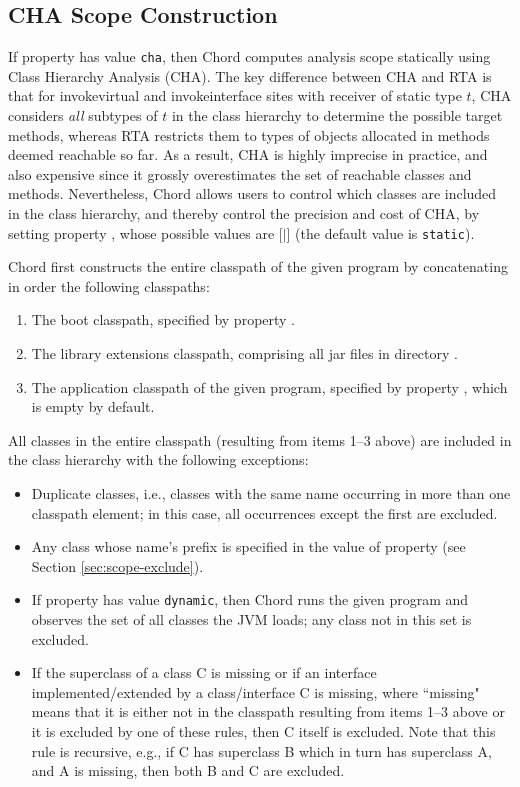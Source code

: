 \subsection{CHA Scope Construction}

If property  has value {\tt cha}, then Chord
computes analysis scope statically using Class Hierarchy Analysis (CHA).
The key difference between CHA and RTA is that for invokevirtual and
invokeinterface sites with receiver of static type $t$, CHA considers
{\it all} subtypes of $t$ in the class hierarchy to determine the
possible target methods, whereas RTA restricts them to types of
objects allocated in methods deemed reachable so far.  As a result,
CHA is highly imprecise in practice, and also expensive since it
grossly overestimates the set of reachable classes and methods.
Nevertheless, Chord allows users to control which classes are
included in the class hierarchy, and thereby control the
precision and cost of CHA, by setting property ,
whose possible values are [$|$] (the default
value is {\tt static}).

Chord first constructs the entire classpath of the given program by
concatenating in order the following classpaths:

\begin{enumerate}
\item
The boot classpath, specified by property .
\item
The library extensions classpath, comprising all jar files in
directory .
\item
The application classpath of the given program, specified by property ,
which is empty by default.
\end{enumerate}

All classes in the entire classpath (resulting from items 1--3 above)
are included in the class hierarchy with the following exceptions:
\begin{itemize}
\item
Duplicate classes, i.e., classes with the same name occurring in more
than one classpath element; in this case, all occurrences except the
first are excluded.
\item
Any class whose name's prefix is specified in the value of property
 (see Section \ref{sec:scope-exclude}).
\item
If property  has value {\tt dynamic}, then
Chord runs the given program and observes the set of all classes the
JVM loads; any class not in this set is excluded.
\item
If the superclass of a class C is missing or if an interface
implemented/extended by a class/interface C is missing, where
``missing" means that it is either not in the classpath resulting from
items 1--3 above or it is excluded by one of these rules, then C
itself is excluded.  Note that this rule is recursive, e.g., if C has
superclass B which in turn has superclass A, and A is missing, then
both B and C are excluded.
\end{itemize}

